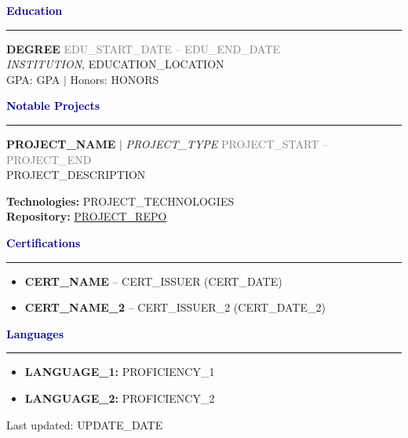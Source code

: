 \documentclass[11pt,letterpaper]{article}
\newcommand{\section}[1]{\textcolor{darkblue}{\textbf{\large #1}}\hrule\vspace{0.1in}}
\begin{document}
\section{Education}

\textbf{{DEGREE}} \hfill \textcolor{gray}{{EDU\_START\_DATE} -- {EDU\_END\_DATE}} \\
\textit{{INSTITUTION}}, {EDUCATION\_LOCATION} \\
GPA: {GPA} $|$ Honors: {HONORS}
\vspace{0.15in}

\section{Notable Projects}

\textbf{{PROJECT\_NAME}} $|$ \textit{{PROJECT\_TYPE}} \hfill \textcolor{gray}{{PROJECT\_START} -- {PROJECT\_END}} \\
{PROJECT\_DESCRIPTION}

\textbf{Technologies:} {PROJECT\_TECHNOLOGIES} \\
\textbf{Repository:} \href{{PROJECT\_REPO}}{{PROJECT\_REPO}}
\vspace{0.15in}

\section{Certifications}

\begin{itemize}[leftmargin=0.2in]
    \item \textbf{{CERT\_NAME}} -- {CERT\_ISSUER} ({CERT\_DATE})
    \item \textbf{{CERT\_NAME\_2}} -- {CERT\_ISSUER\_2} ({CERT\_DATE\_2})
\end{itemize}
\vspace{0.15in}

\section{Languages}

\begin{itemize}[leftmargin=0.2in]
    \item \textbf{{LANGUAGE\_1}:} {PROFICIENCY\_1}
    \item \textbf{{LANGUAGE\_2}:} {PROFICIENCY\_2}
\end{itemize}

\vspace{0.2in}
\centerline{\footnotesize Last updated: {UPDATE\_DATE}}
\end{document}
